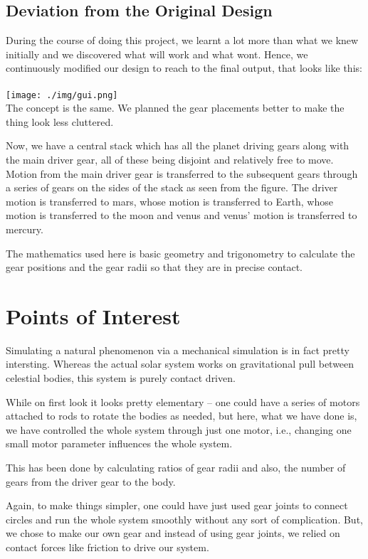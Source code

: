 \documentclass[12pt]{article}
\begin{document}
\subsection{Deviation from the Original Design}
During the course of doing this project, we learnt a lot more than what we knew initially and we discovered what will work and what wont. Hence, we continuously modified our design to reach to the final output, that looks like this:
\\ \\
\texttt{[image: ./img/gui.png]}
\\

The concept is the same. We planned the gear placements better to make the thing look less cluttered. 

Now, we have a central stack which has all the planet driving gears along with the main driver gear, all of these being disjoint and relatively free to move. Motion from the main driver gear is transferred to the subsequent gears through a series of gears on the sides of the stack as seen from the figure. The driver motion is transferred to mars, whose motion is transferred to Earth, whose motion is transferred to the moon and venus and venus' motion is transferred to mercury.

The mathematics used here is basic geometry and trigonometry to calculate the gear positions and the gear radii so that they are in precise contact.

\section{Points of Interest}
Simulating a natural phenomenon via a mechanical simulation is in fact pretty intersting. Whereas the actual solar system works on gravitational pull between celestial bodies, this system is purely contact driven. 

While on first look it looks pretty elementary -- one could have a series of motors attached to rods to rotate the bodies as needed, but here, what we have done is, we have controlled the whole system through just one motor, i.e., changing one small motor parameter influences the whole system.

This has been done by calculating ratios of gear radii and also, the number of gears from the driver gear to the body.

Again, to make things simpler, one could have just used gear joints to connect circles and run the whole system smoothly without any sort of complication. But, we chose to make our own gear and instead of using gear joints, we relied on contact forces like friction to drive our system.
\end{document}
